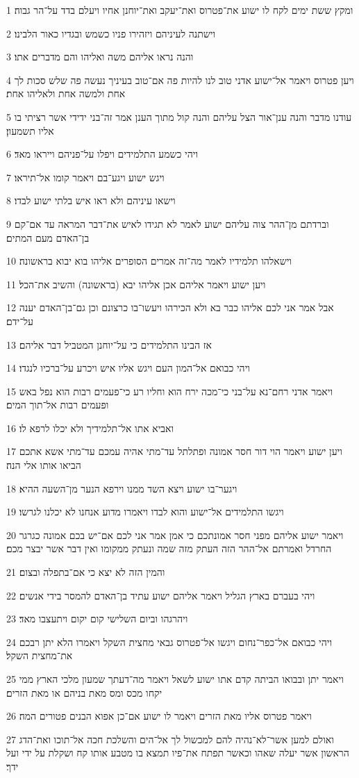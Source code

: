 \par 1 ומקץ ששת ימים לקח לו ישוע את־פטרוס ואת־יעקב ואת־יוחנן אחיו ויעלם בדד על־הר גבוה׃
\par 2 וישתנה לעיניהם ויזהירו פניו כשמש ובגדיו כאור הלבינו׃
\par 3 והנה נראו אליהם משה ואליהו והם מדברים אתו׃
\par 4 ויען פטרוס ויאמר אל־ישוע אדני טוב לנו להיות פה אם־טוב בעיניך נעשה פה שלש סכות לך אחת ולמשה אחת ולאליהו אחת׃
\par 5 עודנו מדבר והנה ענן־אור הצל עליהם והנה קול מתוך הענן אמר זה־בני ידידי אשר רציתי בו אליו תשמעון׃
\par 6 ויהי כשמע התלמידים ויפלו על־פניהם וייראו מאד׃
\par 7 ויגש ישוע ויגע־בם ויאמר קומו אל־תיראו׃
\par 8 וישאו עיניהם ולא ראו איש בלתי ישוע לבדו׃
\par 9 וברדתם מן־ההר צוה עליהם ישוע לאמר לא תגידו לאיש את־דבר המראה עד אם־קם בן־האדם מעם המתים׃
\par 10 וישאלהו תלמידיו לאמר מה־זה אמרים הסופרים אליהו בוא יבוא בראשונה׃
\par 11 ויען ישוע ויאמר אליהם אכן אליהו יבא (בראשונה) והשיב את־הכל׃
\par 12 אבל אמר אני לכם אליהו כבר בא ולא הכירהו ויעשו־בו כרצונם וכן גם־בן־האדם יענה על־ידם׃
\par 13 אז הבינו התלמידים כי על־יוחנן המטביל דבר אליהם׃
\par 14 ויהי כבואם אל־המון העם ויגש אליו איש ויכרע על־ברכיו לנגדו׃
\par 15 ויאמר אדני רחם־נא על־בני כי־מכה ירח הוא וחליו רע כי־פעמים רבות הוא נפל באש ופעמים רבות אל־תוך המים׃
\par 16 ואביא אתו אל־תלמידיך ולא יכלו לרפא לו׃
\par 17 ויען ישוע ויאמר הוי דור חסר אמונה ופתלתל עד־מתי אהיה עמכם עד־מתי אשא אתכם הביאו אותו אלי הנה׃
\par 18 ויגער־בו ישוע ויצא השד ממנו וירפא הנער מן־השעה ההיא׃
\par 19 ויגשו התלמידים אל־ישוע והוא לבדו ויאמרו מדוע אנחנו לא יכלנו לגרשו׃
\par 20 ויאמר ישוע אליהם מפני חסר אמונתכם כי אמן אמר אני לכם אם־יש בכם אמונה כגרגר החרדל ואמרתם אל־ההר הזה העתק מזה שמה ונעתק ממקומו ואין דבר אשר יבצר מכם׃
\par 21 והמין הזה לא יצא כי אם־בתפלה ובצום׃
\par 22 ויהי בעברם בארץ הגליל ויאמר אליהם ישוע עתיד בן־האדם להמסר בידי אנשים׃
\par 23 ויהרגהו וביום השלישי קום יקום ויתעצבו מאד׃
\par 24 ויהי כבואם אל־כפר־נחום ויגשו אל־פטרוס גבאי מחצית השקל ויאמרו הלא יתן רבכם את־מחצית השקל׃
\par 25 ויאמר יתן ובבואו הביתה קדם אתו ישוע לשאל ויאמר מה־דעתך שמעון מלכי הארץ ממי יקחו מכס ומס מאת בניהם או מאת הזרים׃
\par 26 ויאמר פטרוס אליו מאת הזרים ויאמר לו ישוע אם־כן אפוא הבנים פטורים המה׃
\par 27 ואולם למען אשר־לא־נהיה להם למכשול לך אל־הים והשלכת חכה אל־תוכו ואת־הדג הראשון אשר יעלה שאהו וכאשר תפתח את־פיו תמצא בו מטבע אותו קח ושקלת על ידי ועל ידך׃

